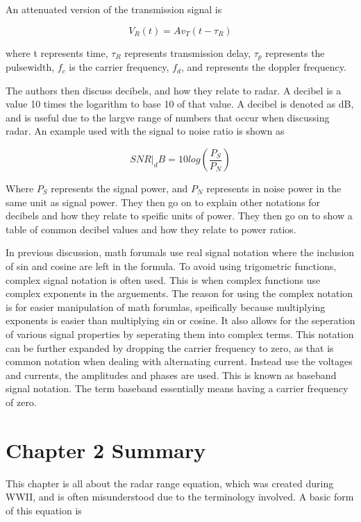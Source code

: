 \documentclass[12pt]{article}
\begin{document}
An attenuated version of the transmission signal is

\begin{equation}
    V_R(t) = Av_T(t- \tau_R)
\end{equation}

where t represents time, $\tau_R$ represents transmission delay, $\tau_p$ represents the pulsewidth, $f_c$ is the carrier frequency, $f_d$, and represents the doppler frequency.

The authors then discuss decibels, and how they relate to radar. A decibel is a value 10 times the logarithm to base 10 of that value. A decibel is denoted as dB, and is useful due to the largve range of numbers that occur when discussing radar. An example used with the signal to noise ratio is shown as

\begin{equation}
    SNR|_dB = 10log \left( \frac{P_S}{P_N} \right)
\end{equation}

Where $P_S$ represents the signal power, and $P_N$ represents in noise power in the same unit as signal power. They then go on to explain other notations for decibels and how they relate to speific units of power. They then go on to show a table of common decibel values and how they relate to power ratios.

In previous discussion, math forumals use real signal notation where the inclusion of sin and cosine are left in the formula. To avoid using trigometric functions, complex signal notation is often used. This is when complex functions use complex exponents in the arguements. The reason for using the complex notation is for easier manipulation of math forumlas, speifically because multiplying exponents is easier than multiplying sin or cosine. It also allows for the seperation of various signal properties by seperating them into complex terms. This notation can be further expanded by dropping the carrier frequency to zero, as that is common notation when dealing with alternating current. Instead use the voltages and currents, the amplitudes and phases are used. This is known as baseband signal notation. The term baseband essentially means having a carrier frequency of zero. 

\section{Chapter 2 Summary}

This chapter is all about the radar range equation, which was created during WWII, and is often misunderstood due to the terminology involved. A basic form of this equation is 
\end{document}
